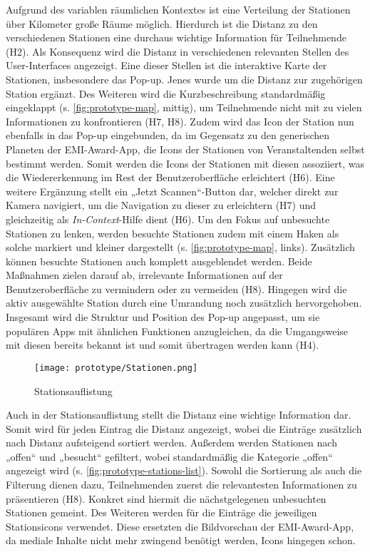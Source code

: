 Aufgrund des variablen räumlichen Kontextes ist eine Verteilung der Stationen
über Kilometer große Räume möglich. Hierdurch ist die Distanz zu den
verschiedenen Stationen eine durchaus wichtige Information für Teilnehmende
(H2). Als Konsequenz wird die Distanz in verschiedenen relevanten Stellen des
User-Interfaces angezeigt. Eine dieser Stellen ist die interaktive Karte der
Stationen, insbesondere das Pop-up. Jenes wurde um die Distanz zur zugehörigen
Station ergänzt. Des Weiteren wird die Kurzbeschreibung standardmäßig
eingeklappt (s. \autoref{fig:prototype-map}, mittig), um Teilnehmende nicht mit
zu vielen Informationen zu konfrontieren (H7, H8). Zudem wird das Icon der
Station nun ebenfalls in das Pop-up eingebunden, da im Gegensatz zu den
generischen Planeten der EMI-Award-App, die Icons der Stationen von
Veranstaltenden selbst bestimmt werden. Somit werden die Icons der Stationen mit
diesen assoziiert, was die Wiedererkennung im Rest der Benutzeroberfläche
erleichtert (H6). Eine weitere Ergänzung stellt ein „Jetzt Scannen“-Button dar,
welcher direkt zur Kamera navigiert, um die Navigation zu dieser zu erleichtern
(H7) und gleichzeitig als \textit{In-Context}-Hilfe dient (H6). Um den Fokus auf
unbesuchte Stationen zu lenken, werden besuchte Stationen zudem mit einem Haken
als solche markiert und kleiner dargestellt (s. \autoref{fig:prototype-map},
links). Zusätzlich können besuchte Stationen auch komplett ausgeblendet werden.
Beide Maßnahmen zielen darauf ab, irrelevante Informationen auf der
Benutzeroberfläche zu vermindern oder zu vermeiden (H8). Hingegen wird die aktiv
ausgewählte Station durch eine Umrandung noch zusätzlich hervorgehoben.
Insgesamt wird die Struktur und Position des Pop-up angepasst, um sie populären
Apps mit ähnlichen Funktionen anzugleichen, da die Umgangsweise mit diesen
bereits bekannt ist und somit übertragen werden kann (H4).


\begin{figure}[htpb]
    \centering
    \texttt{[image: prototype/Stationen.png]}
    \caption{Stationsauflistung}
    \label{fig:prototype-stations-list}
\end{figure}

Auch in der Stationsauflistung stellt die Distanz eine wichtige Information dar.
Somit wird für jeden Eintrag die Distanz angezeigt, wobei die Einträge
zusätzlich nach Distanz aufsteigend sortiert werden. Außerdem werden Stationen
nach „offen“ und „besucht“ gefiltert, wobei standardmäßig die Kategorie „offen“
angezeigt wird (s. \autoref{fig:prototype-stations-list}). Sowohl die Sortierung als auch die Filterung dienen dazu,
Teilnehmenden zuerst die relevantesten Informationen zu präsentieren (H8).
Konkret sind hiermit die nächstgelegenen unbesuchten Stationen gemeint. Des
Weiteren werden für die Einträge die jeweiligen Stationsicons verwendet. Diese
ersetzten die Bildvorschau der EMI-Award-App, da mediale Inhalte nicht mehr
zwingend benötigt werden, Icons hingegen schon.

